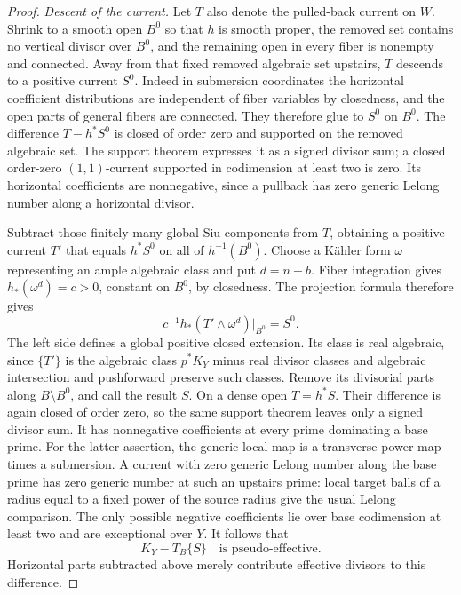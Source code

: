 \begin{proof}
\smallskip
\noindent\emph{Descent of the current.}
Let \(T\) also denote the pulled-back current on \(W\).
Shrink to a smooth open \(B^0\) so that \(h\) is smooth
proper, the removed set contains no vertical divisor
over \(B^0\), and the remaining open in every fiber is
nonempty and connected. Away from that fixed removed
algebraic set upstairs, \(T\) descends to a positive current
\(S^0\).
Indeed in submersion coordinates the horizontal coefficient
distributions are independent of fiber variables by closedness,
and the open parts of general fibers are connected. They
therefore glue to \(S^0\) on \(B^0\). The difference
\(T-h^*S^0\) is closed of order zero and supported on the
removed algebraic set. The support theorem expresses it as a
signed divisor sum; a closed order-zero \((1,1)\)-current
supported in codimension at least two is zero. Its horizontal coefficients are
nonnegative, since a pullback has zero generic Lelong number
along a horizontal divisor.

Subtract those finitely many global Siu components from
\(T\), obtaining a positive current \(T'\) that equals
\(h^*S^0\) on all of \(h^{-1}(B^0)\). Choose a K\"ahler form
\(\omega\) representing an ample algebraic class and put
\(d=n-b\). Fiber integration gives
\(h_*(\omega^d)=c>0\), constant on \(B^0\), by closedness.
The projection formula therefore gives
\[
 c^{-1}h_*(T'\wedge\omega^d)|_{B^0}=S^0.
\]
The left side defines a global positive closed extension.
Its class is real algebraic, since \(\{T'\}\) is the
algebraic class \(p^*K_Y\) minus real divisor classes and
algebraic intersection and pushforward preserve such
classes. Remove its divisorial parts along
\(B\setminus B^0\), and call the result \(S\).
On a dense open \(T=h^*S\). Their difference is again closed
of order zero, so the same support theorem leaves only a
signed divisor sum. It has nonnegative coefficients at every
prime dominating a base prime. For the latter assertion, the
generic local map is a transverse power map times a
submersion. A current with zero generic Lelong number along
the base prime has zero generic number at such an upstairs
prime: local target balls of a radius equal to a fixed power
of the source radius give the usual Lelong comparison.
The only possible negative coefficients lie over base
codimension at least two and are exceptional over \(Y\).
It follows that
\begin{equation}\label{proj:ex:descent-domination}
 K_Y-T_B\{S\}\quad\text{is pseudo-effective}.
\end{equation}
Horizontal parts subtracted above merely contribute effective
divisors to this difference.


\end{proof}
